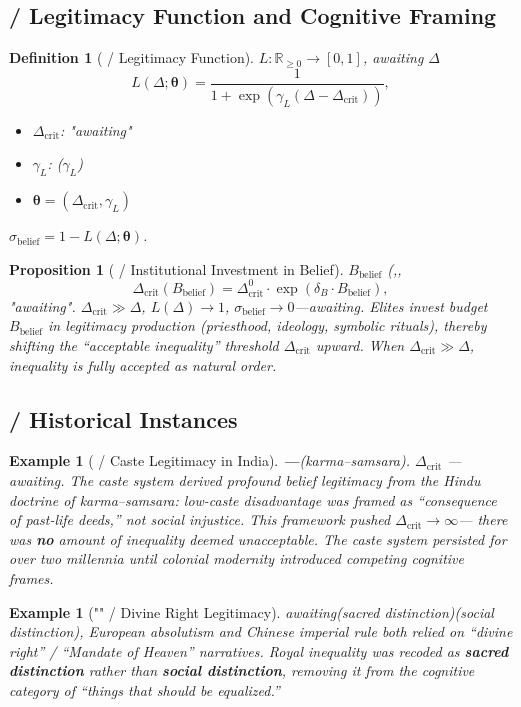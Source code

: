\documentclass[11pt,a4paper]{article}
\newtheorem{proposition}[theorem]{Proposition}
\newtheorem{definition}[theorem]{Definition}
\newtheorem{example}[theorem]{Example}
\theoremstyle{definition}
\newcommand{\suppress}{\sigma}
\newcommand{\R}{\mathbb{R}}
\newcommand{\paren}[1]{\left(#1\right)}
\begin{document}
\subsection{ / Legitimacy Function and Cognitive Framing}
\begin{definition}[ / Legitimacy Function]
\label{def:legitimacy}
 $L: \R_{\geq 0} \to [0,1]$, awaiting $\Delta$ 
\[
L(\Delta; \bm{\theta}) = \frac{1}{1 + \exp\paren{\gamma_L (\Delta - \Delta_{\text{crit}})}},
\]
\begin{itemize}
 \item $\Delta_{\text{crit}}$: "awaiting"
 \item $\gamma_L$: ($\gamma_L$)
 \item $\bm{\theta} = (\Delta_{\text{crit}}, \gamma_L)$ 
\end{itemize}
$\suppress_{\text{belief}} = 1 - L(\Delta; \bm{\theta})$.
\end{definition}
\begin{proposition}[ / Institutional Investment in Belief]
\label{prop:belief}
 $B_{\text{belief}}$ (,, 
\[
\Delta_{\text{crit}}(B_{\text{belief}}) = \Delta_{\text{crit}}^0 \cdot
 \exp\paren{\delta_B \cdot B_{\text{belief}}},
\]
"awaiting". $\Delta_{\text{crit}} \gg \Delta$, 
$L(\Delta) \to 1$, $\suppress_{\text{belief}} \to 0$---awaiting.
Elites invest budget $B_{\text{belief}}$ in legitimacy production (priesthood, ideology,
symbolic rituals), thereby shifting the ``acceptable inequality'' threshold $\Delta_{\text{crit}}$
upward. When $\Delta_{\text{crit}} \gg \Delta$, inequality is fully accepted as natural order.
\end{proposition}
\subsection{ / Historical Instances}
\begin{example}[ / Caste Legitimacy in India]
\label{ex:caste}
\textbf{---}(karma--samsara).
$\Delta_{\text{crit}}$ ---awaiting.
The caste system derived profound belief legitimacy from the Hindu doctrine of
karma--samsara: low-caste disadvantage was framed as ``consequence of past-life deeds,''
not social injustice. This framework pushed $\Delta_{\text{crit}} \to \infty$---
there was \textbf{no} amount of inequality deemed unacceptable. The caste system
persisted for over two millennia until colonial modernity introduced competing
cognitive frames.
\end{example}
\begin{example}["" / Divine Right Legitimacy]
\label{ex:divine}
awaiting(sacred distinction)(social distinction), 
European absolutism and Chinese imperial rule both relied on ``divine right'' /
``Mandate of Heaven'' narratives. Royal inequality was recoded as
\textbf{sacred distinction} rather than \textbf{social distinction},
removing it from the cognitive category of ``things that should be equalized.''
\end{example}
\end{document}
